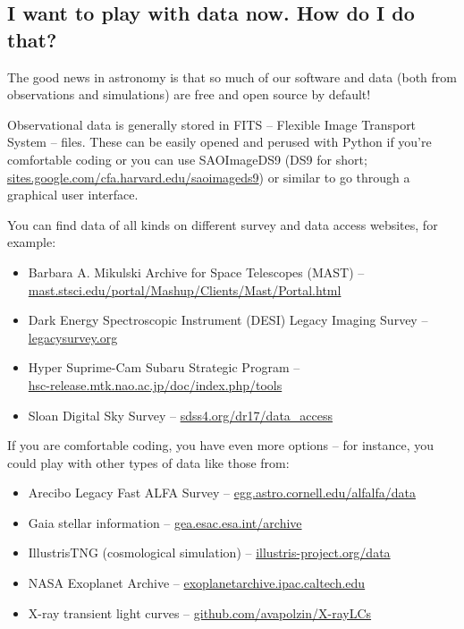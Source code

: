 \vspace{-1cm}

\subsection{I want to play with data now. How do I do that?}

The good news in astronomy is that so much of our software and data (both from observations and simulations) are free and open source by default! 

Observational data is generally stored in FITS -- Flexible Image Transport System -- files. These can be easily opened and perused with Python if you're comfortable coding or you can use SAOImageDS9 (DS9 for short; \href{https://sites.google.com/cfa.harvard.edu/saoimageds9}{sites.google.com/cfa.harvard.edu/saoimageds9}) or similar to go through a graphical user interface.

You can find data of all kinds on different survey and data access websites, for example:
\begin{itemize}
    \item Barbara A. Mikulski Archive for Space Telescopes (MAST) -- \\\href{https://mast.stsci.edu/portal/Mashup/Clients/Mast/Portal.html}{mast.stsci.edu/portal/Mashup/Clients/Mast/Portal.html}
    \item Dark Energy Spectroscopic Instrument (DESI) Legacy Imaging Survey -- \href{https://www.legacysurvey.org}{legacysurvey.org}
    \item Hyper Suprime-Cam Subaru Strategic Program -- \\\href{https://hsc-release.mtk.nao.ac.jp/doc/index.php/tools/}{hsc-release.mtk.nao.ac.jp/doc/index.php/tools}
    \item Sloan Digital Sky Survey -- \href{https://www.sdss4.org/dr17/data_access/}{sdss4.org/dr17/data\_access}
\end{itemize}

If you are comfortable coding, you have even more options -- for instance, you could play with other types of data like those from:
\begin{itemize}
    \item Arecibo Legacy Fast ALFA Survey -- \href{http://egg.astro.cornell.edu/alfalfa/data/}{egg.astro.cornell.edu/alfalfa/data}
    \item Gaia stellar information -- \href{https://gea.esac.esa.int/archive/}{gea.esac.esa.int/archive}
    \item IllustrisTNG (cosmological simulation) -- \href{https://www.illustris-project.org/data/}{illustris-project.org/data}
    \item NASA Exoplanet Archive -- \href{https://exoplanetarchive.ipac.caltech.edu}{exoplanetarchive.ipac.caltech.edu}
    \item X-ray transient light curves -- \href{https://github.com/avapolzin/X-rayLCs}{github.com/avapolzin/X-rayLCs}
\end{itemize}

